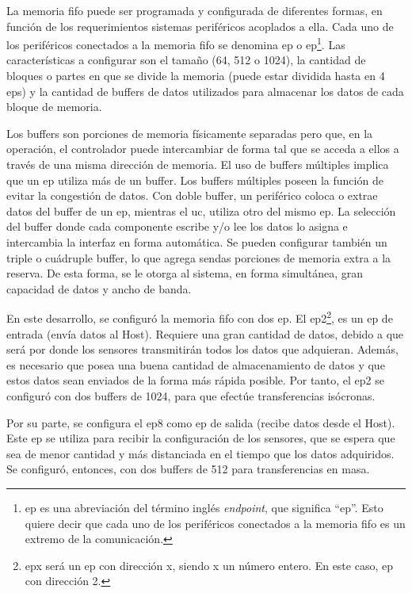 	La memoria \acrshort{fifo} puede ser programada y configurada de diferentes formas, en función de los requerimientos sistemas periféricos acoplados a ella. Cada uno de los periféricos conectados a la memoria \acrshort{fifo} se denomina \acrlong{ep} o \acrshort{ep}\footnote{\acrshort{ep} es una abreviación del término inglés {\it endpoint}, que significa ``\acrlong{ep}''. Esto quiere decir que cada uno de los periféricos conectados a la memoria \acrshort{fifo} es un extremo de la comunicación.}. Las características a configurar son el tamaño (\si{64}, \si{512} o \SI{1024}{\byte}), la cantidad de bloques o partes en que se divide la memoria (puede estar dividida hasta en 4 \acrshort{ep}s) y la cantidad de buffers de datos utilizados para almacenar los datos de cada bloque de memoria.
	
	Los buffers son porciones de memoria físicamente separadas pero que, en la operación, el controlador puede intercambiar de forma tal que se acceda a ellos a través de una misma dirección de memoria. El uso de buffers múltiples implica que un \acrshort{ep} utiliza más de un buffer. Los buffers múltiples poseen la función de evitar la congestión de datos. Con doble buffer, un periférico coloca o extrae datos del buffer de un \acrshort{ep}, mientras el \acrshort{uc}, utiliza otro del mismo \acrshort{ep}. La selección del buffer donde cada componente escribe y/o lee los datos lo asigna e intercambia la interfaz en forma automática. Se pueden configurar también un triple o cuádruple buffer, lo que agrega sendas porciones de memoria extra a la reserva. De esta forma, se le otorga al sistema, en forma simultánea, gran capacidad de datos y ancho de banda.
	
	En este desarrollo, se configuró la memoria \acrshort{fifo} con dos \acrshort{ep}. El \acrshort{ep}2\footnote{\acrshort{ep}x será un \acrfull{ep} con dirección x, siendo x un número entero. En este caso, \acrshort{ep} con dirección 2.}, es un \acrshort{ep} de entrada (envía datos al Host). Requiere una gran cantidad de datos, debido a que será por donde los sensores transmitirán todos los datos que adquieran. Además, es necesario que posea una buena cantidad de almacenamiento de datos y que estos datos sean enviados de la forma más rápida posible. Por tanto, el \acrshort{ep}2 se configuró con dos buffers de \SI{1024}{\byte}, para que efectúe transferencias isócronas.
	
	Por su parte, se configura el \acrshort{ep}8 como \acrshort{ep} de salida (recibe datos desde el Host). Este \acrshort{ep} se utiliza para recibir la configuración de los sensores, que se espera que sea de menor cantidad y más distanciada en el tiempo que los datos adquiridos. Se configuró, entonces, con dos buffers de \SI{512}{\byte} para transferencias en masa.
	
